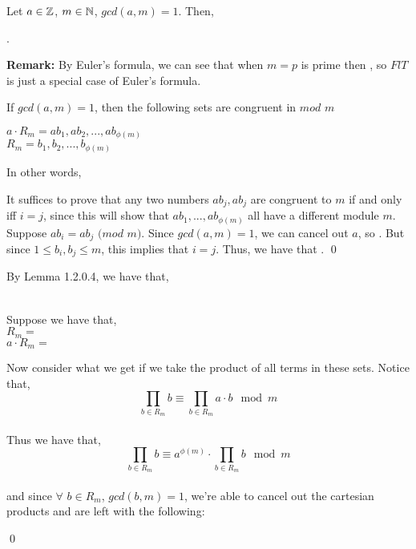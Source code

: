 \documentclass[../main.tex]{subfiles}
\begin{document}
\begin{thm}
    Let $a \in \mathbb{Z}$, $m \in \mathbb{N}$, $gcd(a,m)=1$. Then, \\
    \centerline{.}
\end{thm}
\textbf{Remark:} By Euler's formula, we can see that when $m=p$ is prime then , so $FlT$ is just a special case of Euler's formula.
\begin{lem}
    If $gcd(a,m)=1$, then the following sets are congruent in $mod$ $m$
    \begin{center}
        $a \cdot R_m = ab_1,ab_2,...,ab_{\phi{(m)}}$ \\
        $R_m = b_1,b_2,...,b_{\phi{(m)}}$
    \end{center}
    In other words, 
\end{lem}
\begin{pf}[Lemma 1.2.0.4]
    It suffices to prove that any two numbers $ab_j,ab_j$ are congruent to $m$ if and only iff $i=j$, since this will show that $ab_1,...,ab_{\phi{(m)}}$ all have a different module $m$. \sspace
    Suppose $ab_i=ab_j$ $(mod$ $m)$. Since $gcd(a,m)=1$, we can cancel out $a$, so . But since $1 \leq b_i,b_j \leq m$, this implies that $i=j$. \sspace
    Thus, we have that . \qed
\end{pf}
\begin{pf}
    By Lemma 1.2.0.4, we have that,
    \begin{center}
         \\
        Suppose we have that, \\
        $R_m=$  \\
        $a \cdot R_m=$  \\
    \end{center}
    Now consider what we get if we take the product of all terms in these sets. Notice that,
    $$\prod_{b \in R_m} b \equiv \prod_{b \in R_m} a \cdot b \mod{m}$$ \\
    Thus we have that,
    $$\prod_{b \in R_m} b \equiv a^{\phi(m)} \cdot \prod_{b \in R_m} b \mod{m}$$ \\
    and since $\forall$ $b \in R_m$, $gcd(b,m)=1$, we're able to cancel out the cartesian products and are left with the following:
    \begin{center}
    \end{center}
    \qed
\end{pf}
\end{document}
